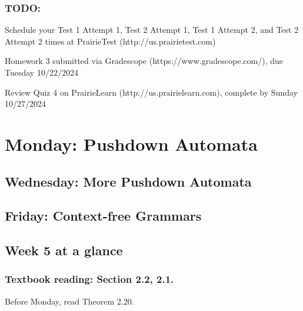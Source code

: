 \vspace{-20pt}

\subsubsection*{TODO:}
\begin{list}{\itemsep-10pt}
   \item Schedule your Test 1 Attempt 1, Test 2 Attempt 1, Test 1 Attempt 2, and Test 2 Attempt 2 times 
   at PrairieTest (http://us.prairietest.com)
   \item Homework 3 submitted via Gradescope (https://www.gradescope.com/), due Tuesday 10/22/2024
   \item Review Quiz 4 on PrairieLearn (http://us.prairielearn.com), complete by Sunday 10/27/2024
\end{list}

\newpage
\section*{Monday: Pushdown Automata}


    
\newpage
\subsection*{Wednesday: More Pushdown Automata}




\newpage
\subsection*{Friday: Context-free Grammars}



\newpage

\subsection*{Week 5 at a glance}

\subsubsection*{Textbook reading: Section 2.2, 2.1.}

\vspace{-20pt}

Before Monday, read Theorem 2.20.

